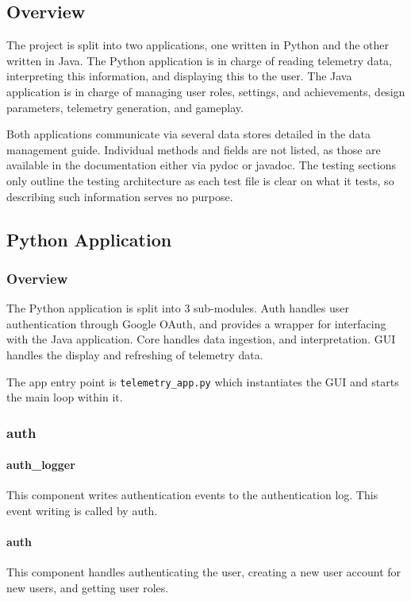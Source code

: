 \documentclass[11pt]{article}
\begin{document}
\subsection{Overview}
The project is split into two applications, one written in Python and the other written in Java. The Python application is in charge of reading telemetry data, interpreting this information, and displaying this to the user. The Java application is in charge of managing user roles, settings, and achievements, design parameters, telemetry generation, and gameplay.

Both applications communicate via several data stores detailed in the data management guide. Individual methods and fields are not listed, as those are available in the documentation either via pydoc or javadoc. The testing sections only outline the testing architecture as each test file is clear on what it tests, so describing such information serves no purpose. 

\subsection{Python Application}

\subsubsection{Overview}
The Python application is split into 3 sub-modules. Auth handles user authentication through Google OAuth, and provides a wrapper for interfacing with the Java application. Core handles data ingestion, and interpretation. GUI handles the display and refreshing of telemetry data.

The app entry point is \verb|telemetry_app.py| which instantiates the GUI and starts the main loop within it.
\subsubsection{auth}

\paragraph{auth\_logger}
This component writes authentication events to the authentication log. This event writing is called by auth.

\paragraph{auth}
This component handles authenticating the user, creating a new user account for new users, and getting user roles.
\end{document}
